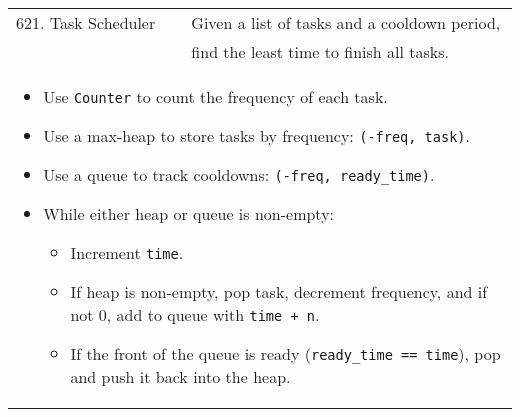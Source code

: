 \begin{summary}
\begin{center}
\begin{tabular}{ll}
            621. Task Scheduler & Given a list of tasks and a cooldown period, \\
            & find the least time to finish all tasks. \\
            \multicolumn{2}{p{\linewidth}}{
                \begin{itemize}
                    \item Use \texttt{Counter} to count the frequency of each task.
                    \item Use a max-heap to store tasks by frequency: \texttt{(-freq, task)}.
                    \item Use a queue to track cooldowns: \texttt{(-freq, ready\_time)}.
                    \item While either heap or queue is non-empty:
                    \begin{itemize}[noitemsep]
                        \item Increment \texttt{time}.
                        \item If heap is non-empty, pop task, decrement frequency, and if not 0, add to queue with \texttt{time + n}.
                        \item If the front of the queue is ready (\texttt{ready\_time == time}), pop and push it back into the heap.
                    \end{itemize}
                \end{itemize}
                } \\
        \end{tabular}
    \end{center}
\end{summary}
\newpage

